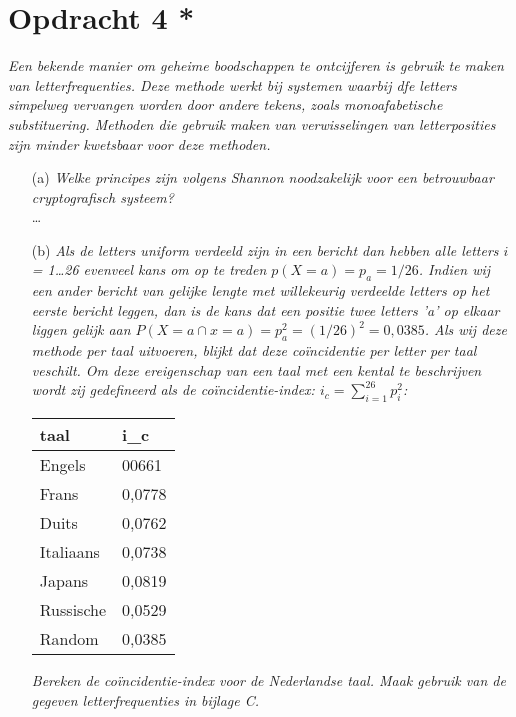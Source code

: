 \section{Opdracht 4 *}
\emph{Een bekende manier om geheime boodschappen te ontcijferen is gebruik te maken van letterfrequenties. Deze methode werkt bij systemen waarbij dfe letters simpelweg vervangen worden door andere tekens, zoals monoafabetische substituering. Methoden die gebruik maken van verwisselingen van letterposities zijn minder kwetsbaar voor deze methoden.}

\begin{itemize}
  \item[(a)] \emph{Welke principes zijn volgens Shannon noodzakelijk voor een betrouwbaar cryptografisch systeem?}\\
  \ldots

  \item[(b)] \emph{Als de letters uniform verdeeld zijn in een bericht dan hebben alle letters $i$ = 1\ldots26 evenveel kans om op te treden $p(X=a)=p_a=1/26$. Indien wij een ander bericht van gelijke lengte met willekeurig verdeelde letters op het eerste bericht leggen, dan is de kans dat een positie twee letters 'a' op elkaar liggen gelijk aan $P(X=a\cap x = a)=p_a^2=(1/26)^2=0,0385$. Als wij deze methode per taal uitvoeren, blijkt dat deze co\"{i}ncidentie per letter per taal veschilt. Om deze ereigenschap van een taal met een kental te beschrijven wordt zij gedefineerd als de \emph{co\"{i}ncidentie-index}: $i_c=\sum ^{26}_{i=1} p^2_i$:}

\begin{center}
\begin{tabular}{ll}
  taal & i_c \\
  \hline
  Engels & 00661 \\ 
  Frans & 0,0778 \\
  Duits & 0,0762 \\
  Italiaans & 0,0738 \\
  Japans & 0,0819 \\
  Russische & 0,0529 \\
  Random & 0,0385 \\
\end{tabular}
\end{center}

\emph{Bereken de co\"{i}ncidentie-index voor de Nederlandse taal. Maak gebruik van de gegeven letterfrequenties in bijlage C.}


\end{itemize}
